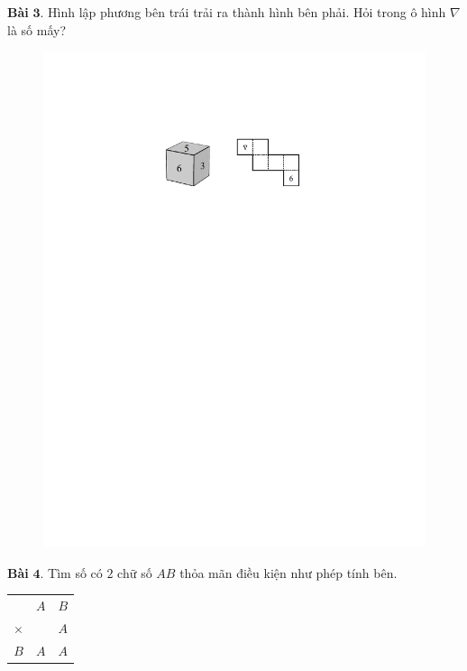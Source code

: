 \begin{multicols}{2}
\begin{figure}[H]
		\vspace*{-5pt}
	\end{figure}
	\textbf{\color{toancuabi}Bài} $\pmb{3.}$ Hình lập phương bên trái trải ra thành hình bên phải. Hỏi trong ô hình $\nabla$ là số mấy?
	\begin{figure}[H]
		\vspace*{-5pt}
		\centering
		\captionsetup{labelformat= empty, justification=centering}
		\includegraphics[width= 0.9\linewidth]{bai3k3}
		\vspace*{-10pt}
	\end{figure}
	\textbf{\color{toancuabi}Bài} $\pmb{4.}$ Tìm số có $2$ chữ số $AB$ thỏa mãn điều kiện như
	phép tính bên.
	\begin{table}[H]
		\vspace*{-5pt}
		\centering
		\captionsetup{labelformat= empty, justification=centering}
		\begin{tabular}{ccc}
			&$A$&$B$\\
			$\times$& &$A$\\
			\hline
			$B$&$A$&$A$\\
		\end{tabular}	
		\vspace*{-10pt}

\end{table}
\end{multicols}
